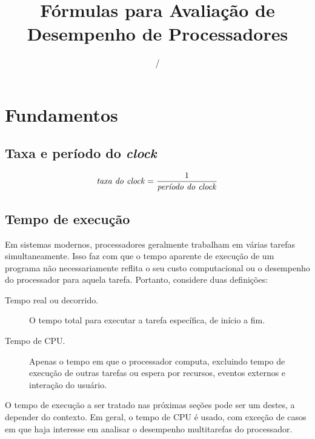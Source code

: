 \documentclass[12pt]{article}
\title{Fórmulas para Avaliação de Desempenho de Processadores}
\author{}
\date{\the\month/\the\year}
\newcommand{\Text}[1]{\textrm{\textit{#1}}}
\begin{document}
\maketitle

\tableofcontents

\vspace*{\fill}

\doclicenseThis

\newpage


\section{Fundamentos}


\subsection{Taxa e período do \textit{clock}}

\[ \Text{taxa do clock} = \frac{1}{\Text{período do clock}} \]


\subsection{Tempo de execução}

Em sistemas modernos, processadores geralmente trabalham em várias tarefas simultaneamente. Isso faz com que o tempo aparente de execução de um programa não necessariamente reflita o seu custo computacional ou o desempenho do processador para aquela tarefa. Portanto, considere duas definições:

\begin{description}
  \item[Tempo real ou decorrido.] O tempo total para executar a tarefa específica, de início a fim.
  \item[Tempo de CPU.] Apenas o tempo em que o processador computa, excluindo tempo de execução de outras tarefas ou espera por recursos, eventos externos e interação do usuário.
\end{description}

O tempo de execução a ser tratado nas próximas seções pode ser um destes, a depender do contexto. Em geral, o tempo de CPU é usado, com exceção de casos em que haja interesse em analisar o desempenho multitarefas do processador.

%
\end{document}
